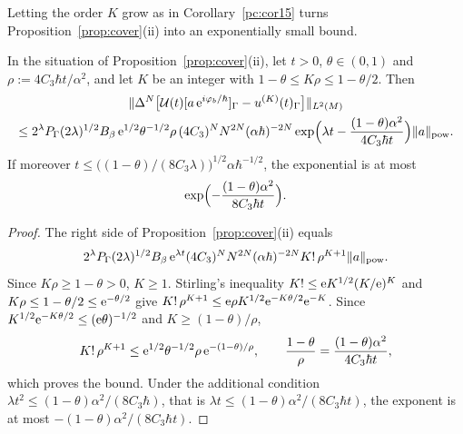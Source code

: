 Letting the order $K$ grow as in Corollary~\ref{pc:cor15} turns Proposition~\ref{prop:cover}(ii) into an exponentially small bound.

\begin{corollary}\label{cor:cover-trunc}
In the situation of Proposition~\textup{\ref{prop:cover}(ii)}, let $t>0$, $\theta\in(0,1)$ and $\rho:=4C_3\hbar t/\alpha^2$, and let
$K$ be an integer with $1-\theta\le K\rho\le1-\theta/2$. Then
\begin{multline*}
\lVert \Delta^N\big[\mathcal{U}(t)[a\,\mathrm{e}^{i\varphi_b/\hbar}]_\Gamma-u^{(K)}(t)_\Gamma\big]\rVert_{L^2(M)}\\
\le2^\lambda P_\Gamma(2\lambda)^{1/2}B_\beta\,\mathrm{e}^{1/2}\theta^{-1/2}\rho\,(4C_3)^NN^{2N}(\alpha\hbar)^{-2N}
\exp\Bigl(\lambda t-\frac{(1-\theta)\alpha^2}{4C_3\hbar t}\Bigr)\lVert a\rVert_{\mathrm{pow}} .
\end{multline*}
If moreover $t\le\bigl((1-\theta)/(8C_3\lambda)\bigr)^{1/2}\alpha\hbar^{-1/2}$, the exponential is at most
\[
\exp\Bigl(-\frac{(1-\theta)\alpha^2}{8C_3\hbar t}\Bigr).
\]
\end{corollary}

\begin{proof}
The right side of Proposition~\ref{prop:cover}(ii) equals
\[
2^\lambda P_\Gamma(2\lambda)^{1/2}B_\beta\,\mathrm{e}^{\lambda t}(4C_3)^NN^{2N}(\alpha\hbar)^{-2N}K!\,\rho^{K+1}\lVert a\rVert_{\mathrm{pow}} .
\]
Since $K\rho\ge1-\theta>0$, $K\ge1$.
Stirling's inequality $K!\le\mathrm{e} K^{1/2}(K/\mathrm{e})^K$ and $K\rho\le1-\theta/2\le\mathrm{e}^{-\theta/2}$ give
$K!\,\rho^{K+1}\le\mathrm{e}\rho K^{1/2}\mathrm{e}^{-K\theta/2}\mathrm{e}^{-K}$. Since $K^{1/2}\mathrm{e}^{-K\theta/2}\le(\mathrm{e}\theta)^{-1/2}$ and $K\ge(1-\theta)/\rho$,
\[
K!\,\rho^{K+1}\le\mathrm{e}^{1/2}\theta^{-1/2}\rho\,\mathrm{e}^{-(1-\theta)/\rho},\qquad\frac{1-\theta}\rho=\frac{(1-\theta)\alpha^2}{4C_3\hbar t},
\]
which proves the bound. Under the additional condition $\lambda t^2\le(1-\theta)\alpha^2/(8C_3\hbar)$, that is
$\lambda t\le(1-\theta)\alpha^2/(8C_3\hbar t)$, the exponent is at most $-(1-\theta)\alpha^2/(8C_3\hbar t)$.
\end{proof}

